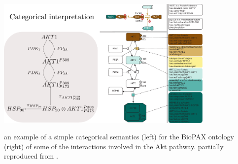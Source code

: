 \begin{frame}
\centering\includegraphics[width=0.8\textwidth]{fig/biopax.pdf}

an example of a simple categorical semantics (left) for the BioPAX ontology \cite{Demir2010} (right) of some of the interactions involved in the Akt pathway. partially reproduced from \cite{Demir2010}.
\end{frame}
